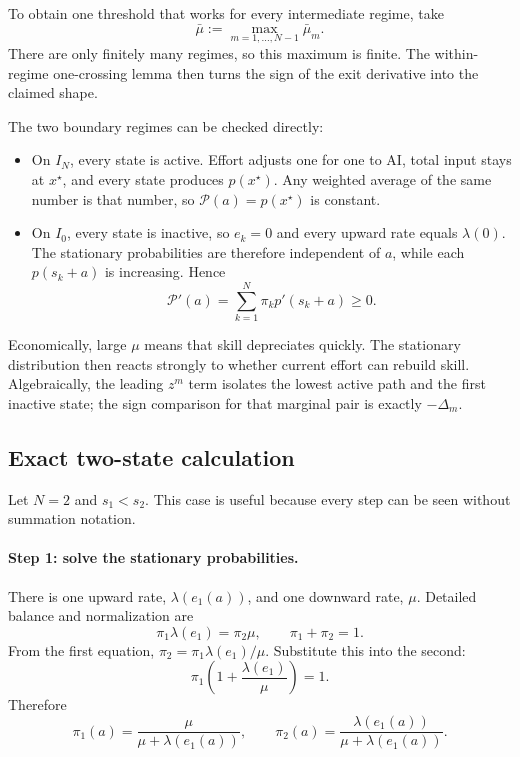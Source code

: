 \documentclass[11pt]{article}
\theoremstyle{tutorial}
\theoremstyle{remark}
\newcommand{\1}{\mathbb{I}}
\newcommand{\calP}{\mathcal{P}}
\begin{document}
To obtain one threshold that works for every intermediate regime, take
\[
  \bar\mu:=\max_{m=1,\ldots,N-1}\bar\mu_m.
\]
There are only finitely many regimes, so this maximum is finite.  The within-regime one-crossing lemma then
turns the sign of the exit derivative into the claimed shape.

The two boundary regimes can be checked directly:
\begin{itemize}
  \item On $I_N$, every state is active.  Effort adjusts one for one to AI, total input stays at $x^\star$,
  and every state produces $p(x^\star)$.  Any weighted average of the same number is that number, so
  $\calP(a)=p(x^\star)$ is constant.
  \item On $I_0$, every state is inactive, so $e_k=0$ and every upward rate equals $\lambda(0)$.  The
  stationary probabilities are therefore independent of $a$, while each $p(s_k+a)$ is increasing.  Hence
  \[
  \calP'(a)=\sum_{k=1}^N\pi_k p'(s_k+a)\ge0.
  \]
\end{itemize}

Economically, large $\mu$ means that skill depreciates quickly.  The stationary distribution then reacts
strongly to whether current effort can rebuild skill.  Algebraically, the leading $z^m$ term isolates the
lowest active path and the first inactive state; the sign comparison for that marginal pair is exactly
$-\Delta_m$.

\subsection{Exact two-state calculation}

Let $N=2$ and $s_1<s_2$.  This case is useful because every step can be seen without summation notation.

\paragraph{Step 1: solve the stationary probabilities.}
There is one upward rate, $\lambda(e_1(a))$, and one downward rate, $\mu$.  Detailed balance and
normalization are
\[
  \pi_1\lambda(e_1)=\pi_2\mu,
  \qquad
  \pi_1+\pi_2=1.
\]
From the first equation, $\pi_2=\pi_1\lambda(e_1)/\mu$.  Substitute this into the second:
\[
  \pi_1\left(1+\frac{\lambda(e_1)}{\mu}\right)=1.
\]
Therefore
\begin{equation}
  \pi_1(a)=\frac{\mu}{\mu+\lambda(e_1(a))},
  \qquad
  \pi_2(a)=\frac{\lambda(e_1(a))}{\mu+\lambda(e_1(a))}.
  \label{eq:two-state-pi}
\end{equation}
\end{document}
